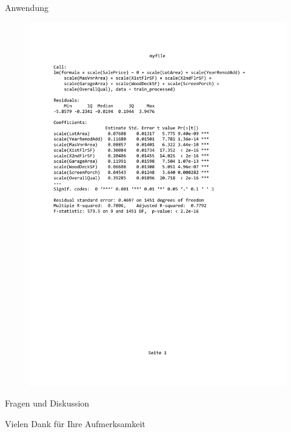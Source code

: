 \documentclass[10pt]{beamer}
\begin{document}
\begin{frame}{Anwendung}
	
	\begin{figure}
		\includegraphics[width=\textwidth, keepaspectratio]{figures/Stand_M}
	\end{figure}

\end{frame}	

\begin{frame}{Fragen und Diskussion}
	\begin{LARGE}
		\begin{center}
			Vielen Dank für Ihre Aufmerksamkeit
		\end{center}
	\end{LARGE}
\end{frame}
\end{document}
